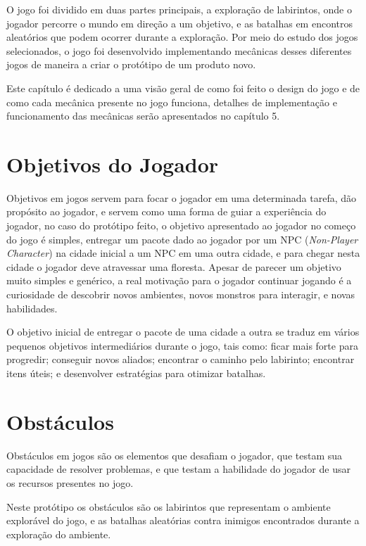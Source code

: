 \documentclass[
	12pt,				%
	openright,			%
	twoside,			%
	a4paper,			%
	english,			%
	french,				%
	spanish,			%
	brazil				%
	]{abntex2}
\begin{document}
O jogo foi dividido em duas partes principais, a exploração de labirintos, onde o jogador percorre o mundo em direção a um objetivo, e as batalhas em encontros aleatórios que podem ocorrer durante a exploração. Por meio do estudo dos jogos selecionados, o jogo foi desenvolvido implementando mecânicas desses diferentes jogos de maneira a criar o protótipo de um produto novo.

	Este capítulo é dedicado a uma visão geral de como foi feito o design do jogo e de como cada mecânica presente no jogo funciona, detalhes de implementação e funcionamento das mecânicas serão apresentados no capítulo 5.

\section{Objetivos do Jogador}

Objetivos em jogos servem para focar o jogador em uma determinada tarefa, dão propósito ao jogador, e servem como uma forma de guiar a experiência do jogador, no caso do protótipo feito, o objetivo apresentado ao jogador no começo do jogo é simples, entregar um pacote dado ao jogador por um NPC (\emph{Non-Player Character}) na cidade inicial a um NPC em uma outra cidade, e para chegar nesta cidade o jogador deve atravessar uma floresta. Apesar de parecer um objetivo muito simples e genérico, a real motivação para o jogador continuar jogando é a curiosidade de descobrir novos ambientes, novos monstros para interagir, e novas habilidades.

	O objetivo inicial de entregar o pacote de uma cidade a outra se traduz em vários pequenos objetivos intermediários durante o jogo, tais como: ficar mais forte para progredir; conseguir novos aliados; encontrar o caminho pelo labirinto; encontrar itens úteis; e desenvolver estratégias para otimizar batalhas.

\section{Obstáculos}

Obstáculos em jogos são os elementos que desafiam o jogador, que testam sua capacidade de resolver problemas, e que testam a habilidade do jogador de usar os recursos presentes no jogo.

	Neste protótipo os obstáculos são os labirintos que representam o ambiente explorável do jogo, e as batalhas aleatórias contra inimigos encontrados durante a exploração do ambiente.
\end{document}
